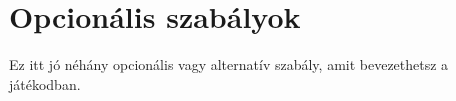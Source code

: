 \label{Opcionális szabályok}
\chapter{Opcionális szabályok}

Ez itt jó néhány opcionális vagy alternatív szabály, amit bevezethetsz a játékodban.
